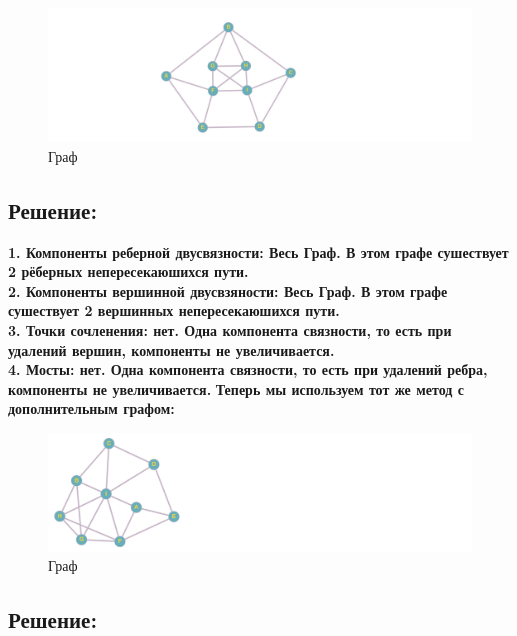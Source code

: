 \documentclass{article}
\begin{document}
\begin{figure}[h]
    \centering
    \includegraphics[width=\textwidth,height=\textheight,keepaspectratio]{4.png}
    \caption{Граф}
    \label{fig:my_label}
\end{figure}
\subsection*{Решение:}

\large{\textbf{1. Компоненты реберной двусвязности: Весь Граф. В этом графе сушествует 2  рёберных непересекаюшихся пути.}}\newline \\
\large{\textbf{2. Компоненты вершинной двусвзяности: Весь Граф. В этом графе сушествует 2 вершинных непересекаюшихся пути.}}\newline\\
\large{\textbf{3. Точки сочленения: нет. Одна компонента связности, то есть при удалений вершин, компоненты не увеличивается. }}\newline\\
\large{\textbf{4. Мосты: нет. Одна компонента связности, то есть при удалений ребра, компоненты не увеличивается.}}\newline
\newpage
\Large\textbf{Теперь мы используем тот же метод с дополнительным графом:}
\begin{figure}[h]
    \centering
    \includegraphics[width=\textwidth,height=\textheight,keepaspectratio]{4 dop.png}
    \caption{Граф}
    \label{fig:my_label}
\end{figure}
\subsection*{Решение:}
\end{document}
